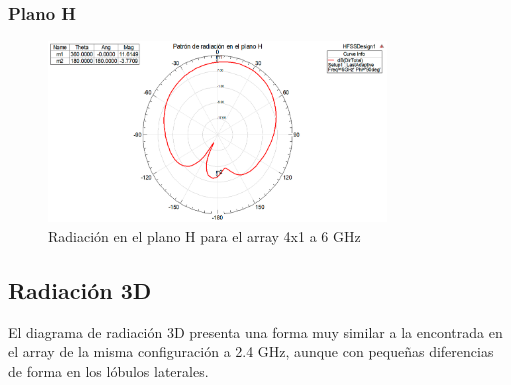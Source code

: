 \subsubsection{Plano H}
\begin{figure}[H]
    \centering
        \includegraphics[width=0.8\textwidth]{archivos/analisis/4x12/5}
        \caption{Radiación en el plano H para el array 4x1 a 6 GHz}
        \label{fig:H4x12}
\end{figure}

\subsection{Radiación 3D}
\par El diagrama de radiación 3D presenta una forma muy similar a la encontrada en el array de la misma configuración a 2.4 GHz, aunque con pequeñas diferencias de forma en los lóbulos laterales.


